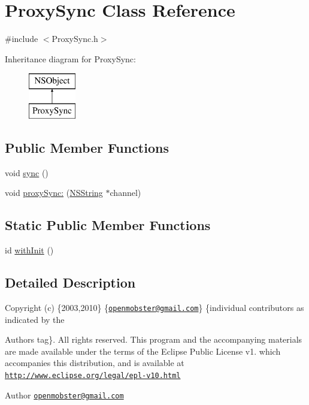 \hypertarget{interface_proxy_sync}{
\section{\-Proxy\-Sync \-Class \-Reference}
\label{interface_proxy_sync}
}


{\ttfamily \#include $<$\-Proxy\-Sync.\-h$>$}

\-Inheritance diagram for \-Proxy\-Sync\-:\begin{figure}[H]
\begin{center}
\leavevmode
\includegraphics[height=2.000000cm]{interface_proxy_sync}
\end{center}
\end{figure}
\subsection*{\-Public \-Member \-Functions}
\begin{DoxyCompactItemize}
\item 
void \hyperlink{interface_proxy_sync_a6c94ba48c36d5c1a584289aaab70d990}{sync} ()
\item 
void \hyperlink{interface_proxy_sync_a4700a16e682274c0e91ab658bc3cf188}{proxy\-Sync\-:} (\hyperlink{class_n_s_string}{\-N\-S\-String} $\ast$channel)
\end{DoxyCompactItemize}
\subsection*{\-Static \-Public \-Member \-Functions}
\begin{DoxyCompactItemize}
\item 
id \hyperlink{interface_proxy_sync_a978924381d291e1601844437ea2eff77}{with\-Init} ()
\end{DoxyCompactItemize}


\subsection{\-Detailed \-Description}
\-Copyright (c) \{2003,2010\} \{\href{mailto:openmobster@gmail.com}{\tt openmobster@gmail.\-com}\} \{individual contributors as indicated by the \begin{DoxyAuthor}{\-Authors}
tag\}. \-All rights reserved. \-This program and the accompanying materials are made available under the terms of the \-Eclipse \-Public \-License v1. which accompanies this distribution, and is available at \href{http://www.eclipse.org/legal/epl-v10.html}{\tt http\-://www.\-eclipse.\-org/legal/epl-\/v10.\-html}
\end{DoxyAuthor}
\begin{DoxyAuthor}{\-Author}
\href{mailto:openmobster@gmail.com}{\tt openmobster@gmail.\-com} 
\end{DoxyAuthor}


